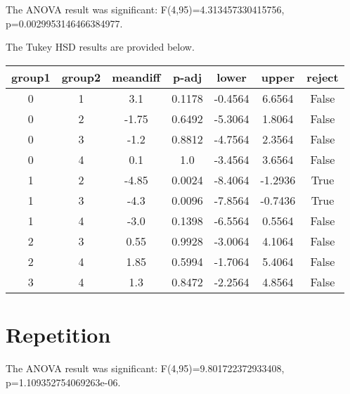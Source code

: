 The ANOVA result was significant: F(4,95)=4.313457330415756, p=0.0029953146466384977.

The Tukey HSD results are provided below.
\begin{center}
\begin{tabular}{ccccccc}
\toprule
\textbf{group1} & \textbf{group2} & \textbf{meandiff} & \textbf{p-adj} & \textbf{lower} & \textbf{upper} & \textbf{reject}  \\
\midrule
       0        &        1        &        3.1        &     0.1178     &    -0.4564     &     6.6564     &      False       \\
       0        &        2        &       -1.75       &     0.6492     &    -5.3064     &     1.8064     &      False       \\
       0        &        3        &        -1.2       &     0.8812     &    -4.7564     &     2.3564     &      False       \\
       0        &        4        &        0.1        &      1.0       &    -3.4564     &     3.6564     &      False       \\
       1        &        2        &       -4.85       &     0.0024     &    -8.4064     &    -1.2936     &       True       \\
       1        &        3        &        -4.3       &     0.0096     &    -7.8564     &    -0.7436     &       True       \\
       1        &        4        &        -3.0       &     0.1398     &    -6.5564     &     0.5564     &      False       \\
       2        &        3        &        0.55       &     0.9928     &    -3.0064     &     4.1064     &      False       \\
       2        &        4        &        1.85       &     0.5994     &    -1.7064     &     5.4064     &      False       \\
       3        &        4        &        1.3        &     0.8472     &    -2.2564     &     4.8564     &      False       \\
\bottomrule
\end{tabular}
\end{center}\section{Repetition}

The ANOVA result was significant: F(4,95)=9.801722372933408, p=1.109352754069263e-06.

